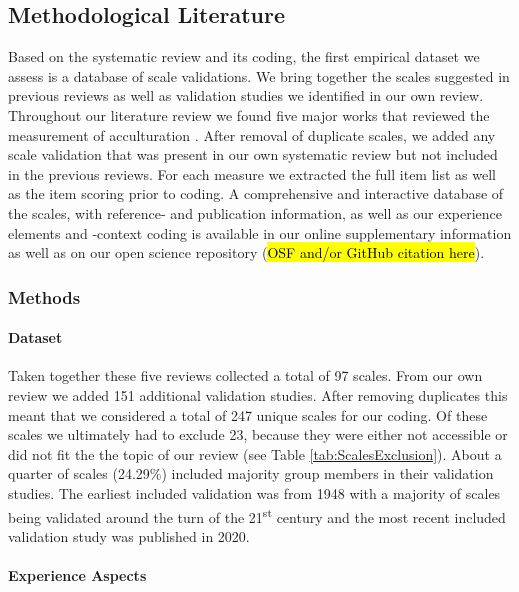 

\subsection{Methodological Literature}

Based on the systematic review and its coding, the first empirical
dataset we assess is a database of scale validations. We bring together
the scales suggested in previous reviews as well as validation studies
we identified in our own review. Throughout our literature review we
found five major works that reviewed the measurement of acculturation
\citep{Celenk2011, Maestas2000, Matsudaira2006, Wallace2010, Zane2004}.
After removal of duplicate scales, we added any scale validation that
was present in our own systematic review but not included in the
previous reviews. For each measure we extracted the full item list as
well as the item scoring prior to coding. A comprehensive and
interactive database of the scales, with reference- and publication
information, as well as our experience elements and -context coding is
available in our online supplementary information as well as on our open
science repository (\hl{OSF and/or GitHub citation here}).

\subsubsection{Methods}  
\paragraph{Dataset}

Taken together these five reviews collected a total of 97 scales. From
our own review we added 151 additional validation studies. After
removing duplicates this meant that we considered a total of 247 unique
scales for our coding. Of these scales we ultimately had to exclude 23,
because they were either not accessible or did not fit the the topic of
our review (see Table \ref{tab:ScalesExclusion}). About a quarter of
scales (24.29\%) included majority group members in their validation
studies. The earliest included validation was from 1948 with a majority
of scales being validated around the turn of the 21\textsuperscript{st}
century and the most recent included validation study was published in
2020.

\paragraph{Experience Aspects}

